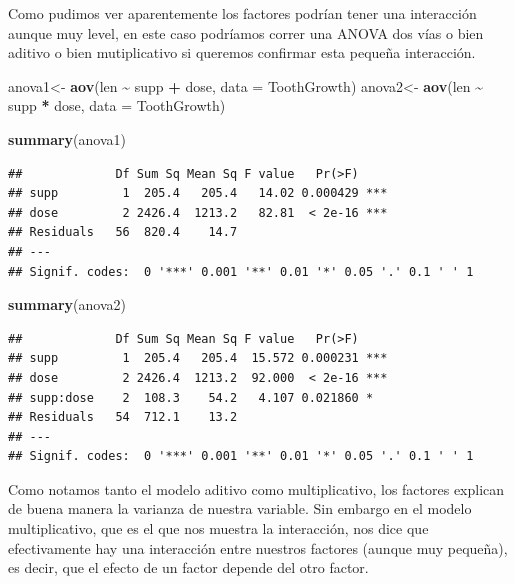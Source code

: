 \documentclass[
]{book}
\newenvironment{Shaded}{\begin{snugshade}}{\end{snugshade}}
\newcommand{\AttributeTok}[1]{\textcolor[rgb]{0.13,0.29,0.53}{#1}}
\newcommand{\FunctionTok}[1]{\textcolor[rgb]{0.13,0.29,0.53}{\textbf{#1}}}
\newcommand{\NormalTok}[1]{#1}
\newcommand{\OtherTok}[1]{\textcolor[rgb]{0.56,0.35,0.01}{#1}}
\newcommand{\SpecialCharTok}[1]{\textcolor[rgb]{0.81,0.36,0.00}{\textbf{#1}}}
\begin{document}
\hfill\break
Como pudimos ver aparentemente los factores podrían tener una interacción aunque muy level, en este caso podríamos correr una ANOVA dos vías o bien aditivo o bien mutiplicativo si queremos confirmar esta pequeña interacción.\\

\begin{Shaded}
\begin{Highlighting}[]
\NormalTok{anova1}\OtherTok{\textless{}{-}} \FunctionTok{aov}\NormalTok{(len }\SpecialCharTok{\textasciitilde{}}\NormalTok{ supp }\SpecialCharTok{+}\NormalTok{ dose, }\AttributeTok{data =}\NormalTok{ ToothGrowth)}
\NormalTok{anova2}\OtherTok{\textless{}{-}}  \FunctionTok{aov}\NormalTok{(len }\SpecialCharTok{\textasciitilde{}}\NormalTok{ supp }\SpecialCharTok{*}\NormalTok{ dose, }\AttributeTok{data =}\NormalTok{ ToothGrowth)}

\FunctionTok{summary}\NormalTok{(anova1)}
\end{Highlighting}
\end{Shaded}

\begin{verbatim}
##             Df Sum Sq Mean Sq F value   Pr(>F)    
## supp         1  205.4   205.4   14.02 0.000429 ***
## dose         2 2426.4  1213.2   82.81  < 2e-16 ***
## Residuals   56  820.4    14.7                     
## ---
## Signif. codes:  0 '***' 0.001 '**' 0.01 '*' 0.05 '.' 0.1 ' ' 1
\end{verbatim}

\begin{Shaded}
\begin{Highlighting}[]
\FunctionTok{summary}\NormalTok{(anova2)}
\end{Highlighting}
\end{Shaded}

\begin{verbatim}
##             Df Sum Sq Mean Sq F value   Pr(>F)    
## supp         1  205.4   205.4  15.572 0.000231 ***
## dose         2 2426.4  1213.2  92.000  < 2e-16 ***
## supp:dose    2  108.3    54.2   4.107 0.021860 *  
## Residuals   54  712.1    13.2                     
## ---
## Signif. codes:  0 '***' 0.001 '**' 0.01 '*' 0.05 '.' 0.1 ' ' 1
\end{verbatim}

\hfill\break
Como notamos tanto el modelo aditivo como multiplicativo, los factores explican de buena manera la varianza de nuestra variable.
Sin embargo en el modelo multiplicativo, que es el que nos muestra la interacción, nos dice que efectivamente hay una interacción entre nuestros factores (aunque muy pequeña), es decir, que el efecto de un factor depende del otro factor.
\end{document}
